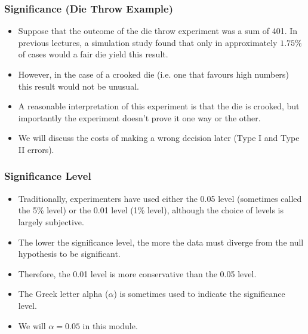 \begin{frame}
\frametitle{Significance (Die Throw Example)}
\begin{itemize}
\item Suppose that the outcome of the die throw experiment was a sum of 401. In previous lectures, a simulation study found that only in approximately $1.75\%$ of cases would a fair die yield this result.
\item However, in the case of a crooked die (i.e. one that favours high numbers) this result would not be unusual.
\item A reasonable interpretation of this experiment is that the die is crooked, but importantly the experiment doesn't prove it one way or the other.
\item We will discuss the costs of making a wrong decision later (Type I and Type II errors).
\end{itemize}
\end{frame}
\begin{frame}
\frametitle{Significance Level}

\begin{itemize}
\item Traditionally, experimenters have used either the 0.05 level (sometimes called the 5\% level) or the 0.01 level (1\% level), although the choice of levels is largely subjective.  \item The lower the significance level, the more the data must diverge from the null hypothesis to be significant. \item Therefore, the 0.01 level is more conservative than the 0.05 level. \item The Greek letter alpha ($\alpha$) is sometimes used to indicate the significance level. \item We will $\alpha =0.05$ in this module. \end{itemize}
\end{frame}

